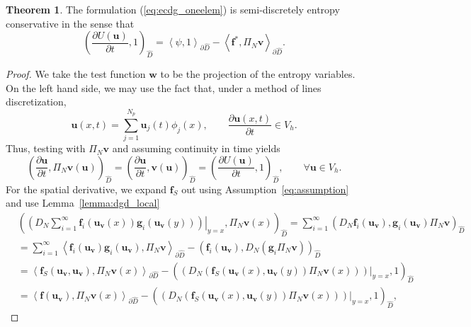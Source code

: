 \documentclass[preprint,10pt]{article}
\theoremstyle{definition}
\theoremstyle{lemma}
\theoremstyle{theorem}
\newtheorem{theorem}{Theorem}
\theoremstyle{assumption}
\newcommand{\pd}[2]{\frac{\partial#1}{\partial#2}}
\newcommand{\LRp}[1]{\left( #1 \right)}
\newcommand{\LRa}[1]{\left\langle #1 \right\rangle}
\begin{document}
\begin{theorem}
\label{lemma:ec1}
The formulation (\ref{eq:ecdg_oneelem})
 is semi-discretely entropy conservative in the sense that
\[
\LRp{\pd{U(\bm{u})}{t},1}_{\widehat{D}} =  \LRa{\psi,1}_{\partial \widehat{D}}-\LRa{{\bm{f}^*, \Pi_N\bm{v}}}_{\partial \widehat{D}}.
\]
\end{theorem}
\begin{proof}
We take the test function $\bm{w}$ to be the projection of the entropy variables.  On the left hand side, we may use the fact that, under a method of lines discretization, 
\[
\bm{u}(x,t) = \sum_{j=1}^{N_p} \bm{u}_j(t) \phi_j(x), \qquad \pd{\bm{u}(x,t)}{t} \in V_h.
\]
Thus, testing with $\Pi_N \bm{v}$ and assuming continuity in time yields 
\[
\LRp{\pd{\bm{u}}{t}, \Pi_N \bm{v}(\bm{u})}_{\widehat{D}} = \LRp{\pd{\bm{u}}{t},\bm{v}(\bm{u})}_{\widehat{D}} = \LRp{\pd{U(\bm{u})}{t},1}_{\widehat{D}}, \qquad \forall \bm{u}\in V_h.
\]
For the spatial derivative, we expand $\bm{f}_S$ out using Assumption~\ref{eq:assumption} and use Lemma~\ref{lemma:dgd_local}
\begin{align*}
&\LRp{\left.\LRp{D_N \sum_{i=1}^{\infty}\bm{f}_i(\bm{u}_{\bm{v}}(x))\bm{g}_i(\bm{u}_{\bm{v}}(y))}\right|_{y=x}, \Pi_N\bm{v}(x)}_{\widehat{D}} = \sum_{i=1}^{\infty} \LRp{{D_N \bm{f}_i(\bm{u}_{\bm{v}})}, {\bm{g}_i(\bm{u}_{\bm{v}})\Pi_N\bm{v} }}_{\widehat{D}}\\
&= \sum_{i=1}^{\infty}\LRa{\bm{f}_i(\bm{u}_{\bm{v}}) \bm{g}_i(\bm{u}_{\bm{v}}),\Pi_N\bm{v}}_{\partial \widehat{D}}  - \LRp{ \bm{f}_i(\bm{u}_{\bm{v}}), D_N \LRp{\bm{g}_i\Pi_N\bm{v} }}_{\widehat{D}}\\
&= \LRa{\bm{f}_S(\bm{u}_{\bm{v}},\bm{u}_{\bm{v}}), \Pi_N\bm{v}(x)}_{\partial \widehat{D}}  - \LRp{\left.\LRp{D_N \LRp{\bm{f}_S(\bm{u}_{\bm{v}}(x),\bm{u}_{\bm{v}}(y))\Pi_N\bm{v}(x)} }\right|_{y=x},1}_{\widehat{D}}\\
&= \LRa{\bm{f}(\bm{u}_{\bm{v}}), \Pi_N\bm{v}(x)}_{\partial \widehat{D}}  - \LRp{\left.\LRp{D_N\LRp{\bm{f}_S(\bm{u}_{\bm{v}}(x),\bm{u}_{\bm{v}}(y))\Pi_N\bm{v}(x)} }\right|_{y=x},1}_{\widehat{D}},

\end{align*}
\end{proof}
\end{document}
